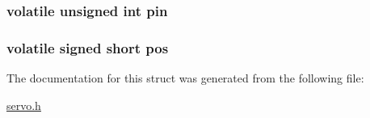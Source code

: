 \subsubsection[{pin}]{\setlength{\rightskip}{0pt plus 5cm}volatile unsigned int pin}\label{struct_s_e_r_v_o_a57e96ac52d84e279b207515b0f55ec85}
\hypertarget{struct_s_e_r_v_o_a39409ea333d7ec5a82aef932f30f8867}{}
\subsubsection[{pos}]{\setlength{\rightskip}{0pt plus 5cm}volatile signed short pos}\label{struct_s_e_r_v_o_a39409ea333d7ec5a82aef932f30f8867}


The documentation for this struct was generated from the following file\+:\begin{DoxyCompactItemize}
\item 
\hyperlink{servo_8h}{servo.\+h}\end{DoxyCompactItemize}
